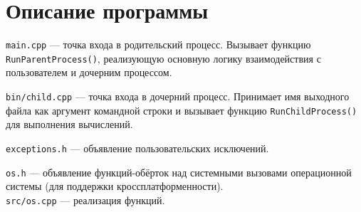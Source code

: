 \section{Описание программы}

\texttt{main.cpp} --- точка входа в родительский процесс. Вызывает функцию \texttt{RunParentProcess()}, реализующую основную логику взаимодействия с пользователем и дочерним процессом.

\texttt{bin/child.cpp} --- точка входа в дочерний процесс. Принимает имя выходного файла как аргумент командной строки и вызывает функцию \texttt{RunChildProcess()} для выполнения вычислений.

\texttt{exceptions.h} --- объявление пользовательских исключений.

\texttt{os.h} --- объявление функций-обёрток над системными вызовами операционной системы (для поддержки кроссплатформенности). \\
\texttt{src/os.cpp} --- реализация функций. \\

